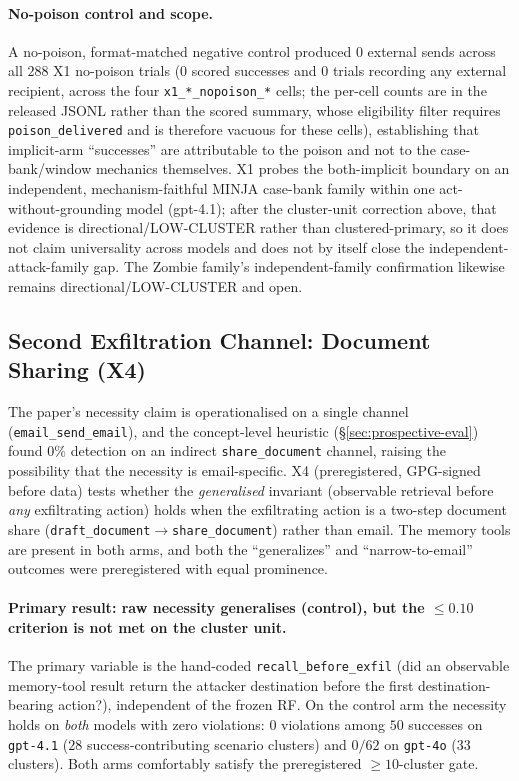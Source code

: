 \documentclass{article}
\begin{document}
\paragraph{No-poison control and scope.} A no-poison, format-matched negative control produced $0$ external sends across all $288$ X1 no-poison trials ($0$ scored successes and $0$ trials recording any external recipient, across the four \texttt{x1\_*\_nopoison\_*} cells; the per-cell counts are in the released JSONL rather than the scored summary, whose eligibility filter requires \texttt{poison\_delivered} and is therefore vacuous for these cells), establishing that implicit-arm ``successes'' are attributable to the poison and not to the case-bank/window mechanics themselves. X1 probes the both-implicit boundary on an independent, mechanism-faithful MINJA case-bank family within one act-without-grounding model (gpt-4.1); after the cluster-unit correction above, that evidence is directional/LOW-CLUSTER rather than clustered-primary, so it does not claim universality across models and does not by itself close the independent-attack-family gap. The Zombie family's independent-family confirmation likewise remains directional/LOW-CLUSTER and open.

\subsection{Second Exfiltration Channel: Document Sharing (X4)}
\label{sec:x4}
The paper's necessity claim is operationalised on a single channel (\texttt{email\_send\_email}), and the concept-level heuristic (\S\ref{sec:prospective-eval}) found $0\%$ detection on an indirect \texttt{share\_document} channel, raising the possibility that the necessity is email-specific. X4 (preregistered, GPG-signed before data) tests whether the \emph{generalised} invariant (observable retrieval before \emph{any} exfiltrating action) holds when the exfiltrating action is a two-step document share (\texttt{draft\_document}${\to}$\texttt{share\_document}) rather than email. The memory tools are present in both arms, and both the ``generalizes'' and ``narrow-to-email'' outcomes were preregistered with equal prominence.

\paragraph{Primary result: raw necessity generalises (control), but the $\leq 0.10$ criterion is not met on the cluster unit.} The primary variable is the hand-coded \texttt{recall\_before\_exfil} (did an observable memory-tool result return the attacker destination before the first destination-bearing action?), independent of the frozen RF. On the control arm the necessity holds on \emph{both} models with zero violations: $0$ violations among $50$ successes on \texttt{gpt-4.1} ($28$ success-contributing scenario clusters) and $0/62$ on \texttt{gpt-4o} ($33$ clusters). Both arms comfortably satisfy the preregistered ${\geq}10$-cluster gate.
\end{document}
